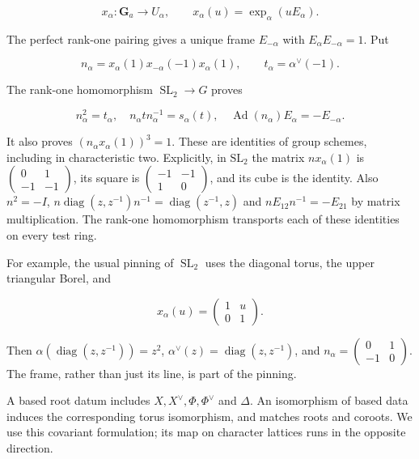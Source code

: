 \documentclass[11pt,a4paper,openany]{report}
\begin{document}
\[
x_\alpha:\mathbf G_a\longrightarrow U_\alpha,\qquad
x_\alpha(u)=\exp_\alpha(uE_\alpha).
\]

The perfect rank-one pairing gives a unique frame \(E_{-\alpha}\) with \(E_\alpha E_{-\alpha}=1\). Put

\[
n_\alpha=x_\alpha(1)x_{-\alpha}(-1)x_\alpha(1),
\qquad t_\alpha=\alpha^\vee(-1).
\tag{1.1}
\]

The rank-one homomorphism \(\operatorname{SL}_2\to G\) proves

\[
n_\alpha^2=t_\alpha,\quad
n_\alpha t n_\alpha^{-1}=s_\alpha(t),\quad
\operatorname{Ad}(n_\alpha)E_\alpha=-E_{-\alpha}.
\tag{1.2}
\]

It also proves \((n_\alpha x_\alpha(1))^3=1\). These are identities of group schemes, including in characteristic two. Explicitly, in \(\mathrm{SL}_2\) the matrix \(nx_\alpha(1)\) is \(\left(\begin{smallmatrix}0&1\\-1&-1\end{smallmatrix}\right)\), its square is \(\left(\begin{smallmatrix}-1&-1\\1&0\end{smallmatrix}\right)\), and its cube is the identity. Also \(n^2=-I\), \(n\operatorname{diag}(z,z^{-1})n^{-1}=\operatorname{diag}(z^{-1},z)\) and \(nE_{12}n^{-1}=-E_{21}\) by matrix multiplication. The rank-one homomorphism transports each of these identities on every test ring.

For example, the usual pinning of \(\operatorname{SL}_2\) uses the diagonal torus, the upper triangular Borel, and

\[
x_\alpha(u)=
\begin{pmatrix}1&u\\0&1\end{pmatrix}.
\]

Then \(\alpha(\operatorname{diag}(z,z^{-1}))=z^2\), \(\alpha^\vee(z)=\operatorname{diag}(z,z^{-1})\), and \(n_\alpha=\left(\begin{smallmatrix}0&1\\-1&0\end{smallmatrix}\right)\). The frame, rather than just its line, is part of the pinning.

A based root datum includes \(X,X^\vee,\Phi,\Phi^\vee\) and \(\Delta\). An isomorphism of based data induces the corresponding torus isomorphism, and matches roots and coroots. We use this covariant formulation; its map on character lattices runs in the opposite direction.
\end{document}
